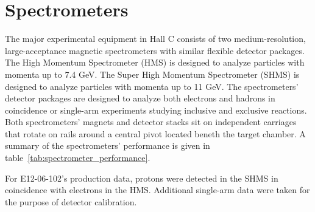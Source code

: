 \section{Spectrometers}
The major experimental equipment in Hall C consists of two medium-resolution,
large-acceptance magnetic spectrometers with similar flexible detector
packages.
The High Momentum Spectrometer (HMS) is designed to analyze particles with
momenta up to 7.4 GeV.
The Super High Momentum Spectrometer (SHMS) is designed to analyze particles
with momenta up to 11 GeV.
The spectrometers' detector packages are designed to analyze both electrons
and hadrons in coincidence or single-arm experiments studying inclusive and
exclusive reactions.
Both spectrometers' magnets and detector stacks sit on independent carriages
that rotate on rails around a central pivot located beneth the target chamber.
A summary of the spectrometers' performance is given in
table~\ref{tab:spectrometer_performance}.


For E12-06-102's production data, protons were detected in the SHMS in
coincidence with electrons in the HMS.
Additional single-arm data were taken for the purpose of detector calibration.

